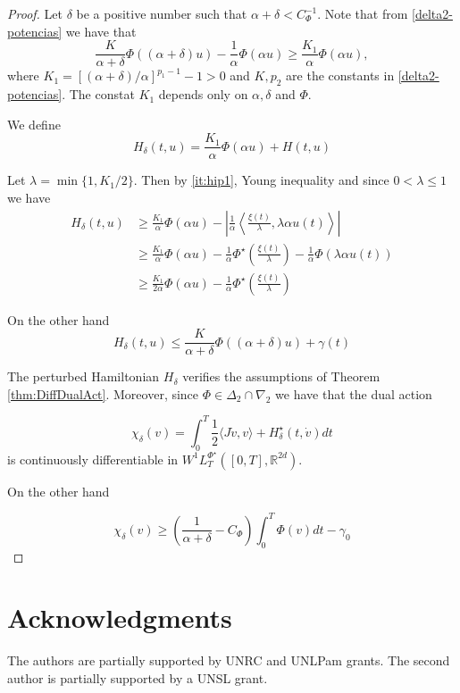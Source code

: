 \documentclass[twoside]{article}
\theoremstyle{remark}
\newcommand{\lpsi}{L^{\Phi^{\star}}}
\newcommand{\rr}{\mathbb{R}}
\renewcommand{\leq}{\leqslant}
\renewcommand{\geq}{\geqslant}
\newcommand{\Phie}{\Phi^{\star}}
\begin{document}
\begin{proof} Let $\delta$ be a positive number such that $\alpha+\delta<C_{\Phi}^{-1}$. Note that from  \eqref{delta2-potencias}  we have that
\[\frac{K}{\alpha+\delta}\Phi\left( (\alpha+\delta) u\right)-
  \frac{1}{\alpha}\Phi\left( \alpha u\right)\geq  \frac{K_1}{\alpha}\Phi\left( \alpha u\right), \]
where $K_1=\left[ (\alpha+\delta)/\alpha\right]^{p_1-1}-1>0$ and $K, p_2$ are the constants in \eqref{delta2-potencias}. The constat $K_1$  depends only on $\alpha,\delta$ and $\Phi$. 


We define
\[
  H_{\delta}(t,u)= \frac{K_1}{\alpha}\Phi\left( \alpha u\right)+H(t,u)
\]
 

Let $\lambda=\min\{1,K_1/2\}$. Then by \ref{it:hip1}, Young inequality and since $0<\lambda\leq 1$ we have
\begin{equation}\label{eq:CotaSupH}
 \begin{split}
    H_{\delta}(t,u)  &\geq  \frac{K_1}{\alpha}\Phi\left( \alpha u\right)-\left| \frac{1}{\alpha} \left\langle \frac{\xi(t)}{\lambda}, \lambda\alpha u(t)\right\rangle \right|  \\
    &\geq  \frac{K_1}{\alpha}\Phi\left( \alpha u\right)- \frac{1}{\alpha} \Phie\left(\frac{\xi(t)}{\lambda}\right) -\frac{1}{\alpha}\Phi\left( \lambda\alpha u(t)\right)  \\
    &\geq  \frac{K_1}{2\alpha}\Phi\left( \alpha u\right)- \frac{1}{\alpha} \Phie\left(\frac{\xi(t)}{\lambda}\right)
  \end{split} 
\end{equation}

On the other hand
\begin{equation}\label{eq:CotaInfH}
  H_{\delta}(t,u)  \leq  \frac{K}{\alpha+\delta}\Phi\left( (\alpha+\delta) u\right)+\gamma(t)
\end{equation}


The perturbed Hamiltonian $H_{\delta}$ verifies the assumptions of Theorem \ref{thm:DiffDualAct}. Moreover, since $\Phi\in\Delta_2\cap \nabla_2$ we have that the dual action

\begin{equation}\label{eq:DualActDelta}
 \chi_{\delta}(v)=\int_0^T \frac{1}{2} \langle J\dot{v},v\rangle+H_{\delta}^{\star}(t,\dot{v})  dt
\end{equation}
is continuously differentiable in $ W^1\lpsi_T([0,T],\rr^{2d})$. 

On the other hand

\[
  \chi_{\delta}(v)\geq \left(\frac{1}{\alpha+\delta}-C_{\Phi} \right) \int_0^T\Phi(v)dt-\gamma_0
\]


\end{proof}








\section*{Acknowledgments}
The authors are partially supported by  UNRC and UNLPam grants. The second author is  partially supported by a  UNSL grant. 




% 
 
 

\end{document}
